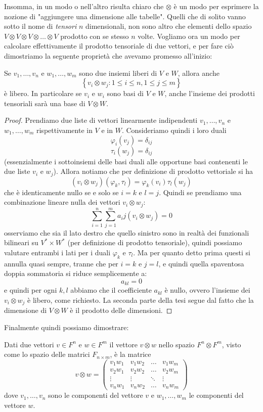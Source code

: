 \documentclass[11pt]{scrartcl}
\begin{document}
   	 Insomma, in un modo o nell'altro risulta chiaro che $\otimes$ è un modo per esprimere la nozione di "aggiungere una dimensione alle tabelle". Quelli che di solito vanno sotto il nome di \textit{tensori} $n$ dimensionali, non sono altro che elementi dello spazio $V\otimes V \otimes V\otimes \dots \otimes V$ prodotto con se stesso $n$ volte. Vogliamo ora un modo per calcolare effettivamente il prodotto tensoriale di due vettori, e per fare ciò dimostriamo la seguente proprietà che avevamo promesso all'inizio:
   	 \begin{lemma}
   	 	Se $v_1,\dots, v_n$ e $w_1,\dots,w_m$ sono due insiemi liberi di $V$ e $W$, allora anche 
   	 	$$\left\{v_i\otimes w_j:1\le i \le n,1\le j \le m\right\}$$
   	 	è libero. In particolare se $v_i$ e $w_i$ sono basi di $V$ e $W$, anche l'insieme dei prodotti tensoriali sarà una base di $V\otimes W$.
   	 \end{lemma}
   	 \begin{proof}
   	 	Prendiamo due liste di vettori linearmente indipendenti $v_1,\dots,v_n$ e $w_1,\dots,w_m$ rispettivamente in $V$ e in $W$. Consideriamo quindi i loro duali
   	 	$$\varphi_i(v_j)=\delta_{ij}$$
   	 	$$\tau_i(w_j)=\delta_{ij}$$
   	 	(essenzialmente i sottoinsiemi delle basi duali alle opportune basi contenenti le due liste $v_i$ e $w_j$). Allora notiamo che per definizione di prodotto vettoriale si ha
   	 	$$(v_i\otimes w_j)(\varphi_k,\tau_l)=\varphi_k(v_i)\tau_l(w_j)$$
   	 	che è identicamente nullo se e solo se $i=k$ e $l=j$. Quindi se prendiamo una combinazione lineare nulla dei vettori $v_i\otimes w_j$:
   	 	$$\sum_{i=1}^{n}\sum_{j=1}^m a_ij(v_i\otimes w_j)=0$$
   	 	osserviamo che sia il lato destro che quello sinistro sono in realtà dei funzionali bilineari su $V^*\times W^*$ (per definizione di prodotto tensoriale), quindi possiamo valutare entrambi i lati per i duali $\varphi_k$ e $\tau_l$. Ma per quanto detto prima questi si annulla quasi sempre, tranne che per $i=k$ e $j=l$, e quindi quella spaventosa doppia sommatoria si riduce semplicemente a:
   	 	$$a_{kl}=0$$
   	 	e quindi per ogni $k,l$ abbiamo che il coefficiente $a_{kl}$ è nullo, ovvero l'insieme dei $v_i\otimes w_j$ è libero, come richiesto. La seconda parte della tesi segue dal fatto che la dimensione di $V\otimes W$ è il prodotto delle dimensioni.
   	 \end{proof}
   	 Finalmente quindi possiamo dimostrare:
   	 \begin{corollary}
   	 	Dati due vettori $v\in F^n$ e $w\in F^m$ il vettore $v\otimes w$ nello spazio $F^n\otimes F^m$, visto come lo spazio delle matrici $F_{n\times m}$, è la matrice
   	 	$$v\otimes w=
   	 	\begin{pmatrix}
   	 		v_1w_1 & v_1w_2 & \dots & v_1w_m \\
   	 		v_2w_1 & v_2w_2 & \dots & v_2w_m \\
   	 		\vdots & \vdots & \ddots& \vdots \\
   	 		v_nw_1 & v_nw_2 & \dots & v_nw_m
   	 	\end{pmatrix}$$ 
   	 	dove $v_1,\dots,v_n$ sono le componenti del vettore $v$ e $w_1,\dots,w_m$ le componenti del vettore $w$.
   	 \end{corollary}
\end{document}
